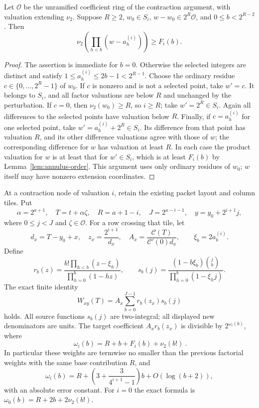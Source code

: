 \begin{lemma}
\label{lem:annulus-extension}
Let $\mathcal O$ be the unramified coefficient ring of the contraction
argument, with valuation extending $\nu_2$. Suppose $R\ge2$,
$w_0\in S_i$, $w-w_0\in2^R\mathcal O$, and
$0\le b<2^{R-2}$. Then
\[
 \nu_2\left(\prod_{h<b}(w-a^{(i)}_h)\right)\ge F_i(b).
\]
\end{lemma}

\begin{proof}
The assertion is immediate for $b=0$. Otherwise the selected integers
are distinct and satisfy $1\le a^{(i)}_h\le2b-1<2^{R-1}$.
Choose the ordinary residue $c\in\{0,\ldots,2^R-1\}$ of $w_0$.
If $c$ is nonzero and is not a selected point, take $w'=c$.
It belongs to $S_i$, and all factor valuations are below $R$ and
unchanged by the perturbation. If $c=0$, then $\nu_2(w_0)\ge R$,
so $i\ge R$; take $w'=2^R\in S_i$. Again all differences to the
selected points have valuation below $R$.
Finally, if $c=a^{(i)}_h$ for one selected point, take
$w'=a^{(i)}_h+2^R\in S_i$. Its difference from that point has
valuation $R$, and its other difference valuations agree with those
of $w$; the corresponding difference for $w$ has valuation at least
$R$. In each case the product valuation for $w$ is at least that for
$w'\in S_i$, which is at least $F_i(b)$ by
Lemma~\ref{lem:annulus-order}. This argument uses only ordinary
residues of $w_0$; $w$ itself may have nonzero extension coordinates.
\end{proof}

\begin{theorem}
\label{thm:annulus-modes}
At a contraction node of valuation $i$, retain the existing packet
layout and column tiles. Put
\[
 \alpha=2^{a+1},\quad T=t+\alpha\zeta,\quad
 R=a+1-i,\quad J=2^{a-i-1},\quad y=y_0+2^{i+1}j,
\]
where $0\le j<J$ and $\zeta\in\mathcal O$. For a row crossing
that tile, let
\[
 d_x=T-y_0+x,\quad z_x=\frac{2^{i+1}}{d_x},\quad
 A_x=\frac{\mathcal C(T)}{\mathcal C'(0)d_x},
 \qquad \xi_b=2a^{(i)}_b.
\]
Define
\[
 r_b(z)=\frac{b!\prod_{h<b}(z-\xi_h)}
                    {\prod_{h=0}^{b}(1-hz)},
 \qquad
 s_b(j)=\frac{(1-b\xi_b)\binom{j}{b}}
                    {\prod_{h=0}^{b}(1-\xi_h j)}.
\]
The exact finite identity
\[
 W_{xy}(T)=A_x\sum_{b=0}^{J-1}r_b(z_x)s_b(j)
\]
holds. All source functions $s_b(j)$ are two-integral; all displayed
new denominators are units. The target coefficient $A_xr_b(z_x)$ is
divisible by $2^{\omega_i(b)}$, where
\[
 \boxed{\ \omega_i(b)=R+b+F_i(b)+\nu_2(b!)\ }.
\]
In particular these weights are termwise no smaller than the previous
factorial weights with the same base contribution $R$, and
\[
 \omega_i(b)=R+\left(3+\frac{3}{4^{i+1}-1}\right)b
                 +O(\log(b+2)),
\]
with an absolute error constant. For $i=0$ the exact formula is
$\omega_0(b)=R+2b+2\nu_2(b!)$.
\end{theorem}

